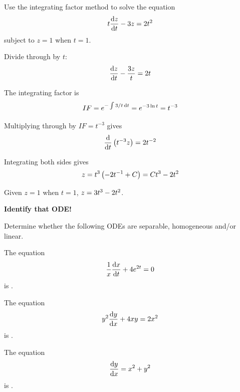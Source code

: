 \goodbreak
\begin{example}[Video]
\label{ex:652}

Use the integrating factor method to solve the equation
\[
t\frac{{\rm d} z}{{\rm d} t}-3z=2{t}^{2}
\]
subject to $z=1$ when $t=1$.

\end{example}
\begin{solution}

Divide through by $t$:
\[
\frac{{\rm d} z}{{\rm d} t}-\frac{3z}{t}=2t
\]

The integrating factor is
\[
IF={e}^{-\int 3/t \, {\rm d}t}={e}^{-3\ln t}={t}^{-3}
\]


Multiplying through by $IF=t^{-3}$ gives
\[
\frac{{\rm d} }{{\rm d} t}\left({t}^{-3}z\right)=2{t}^{-2}
\]

Integrating both sides gives
\[
z={t}^{3}\left({-2t}^{-1}+C\right)=C{t}^{3}-2{t}^{2}
\]

Given $z=1$ when $t=1$, $z=3{t}^{3}-2{t}^{2}$.

\end{solution}

\textbf{Identify that ODE!}

Determine whether the following ODEs are separable, homogeneous and/or linear.

The equation
\[
\frac1x\frac{{\rm d} x}{{\rm d} t}+4e^{2t}=0
\]
is . \par 

The equation
\[
y^2\frac{{\rm d} y}{{\rm d} x}+4xy=2x^2
\]
is .\par 

The equation
\[
\frac{{\rm d} y}{{\rm d} x}=x^2+y^2
\]
is .

